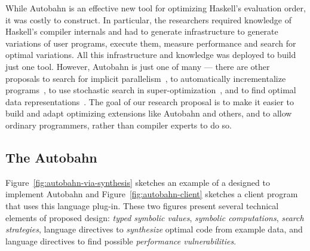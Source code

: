 While Autobahn is an effective new tool for optimizing Haskell's evaluation
order, it was costly to construct.  In particular, the researchers
required knowledge of Haskell's compiler internals and had to generate
infrastructure to generate variations of user programs, execute them,
measure performance and search for optimal variations.  All this
infrastructure and knowledge was deployed to build just one tool.
However, Autobahn is just one of many --- there are other proposals to
search for implicit parallelism~\cite{implicit-parallel}, to
automatically incrementalize
programs~\cite{type-directed-incrementalization}, to use stochastic search
in super-optimization~\cite{stochastic-superopt}, and to find optimal data
representations~\cite{data-rep-synth,conc-data-rep-synth}.  The goal of our research proposal
is to make it easier to build and adapt optimizing extensions like
Autobahn and others, and to allow ordinary programmers, rather than
compiler experts to do so.

\subsection{The Autobahn \rasp}
\label{sec:autobahn}

Figure~\ref{fig:autobahn-via-synthesis} sketches an example of a
\rasp{} designed to implement Autobahn and Figure~\ref{fig:autobahn-client} sketches a client program that uses this language plug-in.  These two
figures present
several technical elements of proposed design:  \emph{typed symbolic values},
\emph{symbolic computations}, \emph{search strategies}, language directives to
\emph{synthesize} optimal code from example data, and language directives to
find possible \emph{performance vulnerabilities}.

